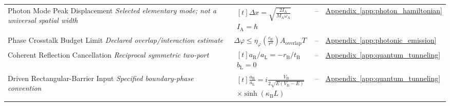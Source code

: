 \begin{longtable}{@{} p{4.5cm} p{6cm} c p{4cm} @{}}
{\raggedright Photon Mode Peak Displacement \newline \textit{Selected elementary mode; not a universal spatial width}\par} & {\raggedright $\begin{gathered}[t]\Delta x=\sqrt{\frac{2I_{\mathrm A}}{M_{\mathrm A}\omega_{\mathrm A}}} \\ I_{\mathrm A}=\hbar\end{gathered}$\par} & -- & {\raggedright \hyperref[app:photon_hamiltonian]{Appendix~\ref*{app:photon_hamiltonian}}\par} \\

{\raggedright Phase Crosstalk Budget Limit \newline \textit{Declared overlap/interaction estimate}\par} & {\raggedright $\Delta\varphi \leq \eta_{\varphi} \left(\frac{c_{\mathrm{E}}}{r^3}\right) A_{\mathrm{overlap}} T$\par} & -- & {\raggedright \hyperref[app:photonic_emission]{Appendix~\ref*{app:photonic_emission}}\par} \\

{\raggedright Coherent Reflection Cancellation \newline \textit{Reciprocal symmetric two-port}\par} & {\raggedright $\begin{gathered}[t]a_{\mathrm R}/a_{\mathrm L}=-r_{\mathrm B}/t_{\mathrm B} \\ b_{\mathrm L}=0\end{gathered}$\par} & -- & {\raggedright \hyperref[app:quantum_tunneling]{Appendix~\ref*{app:quantum_tunneling}}\par} \\

{\raggedright Driven Rectangular-Barrier Input \newline \textit{Specified boundary-phase convention}\par} & {\raggedright $\begin{gathered}[t]\frac{a_{\mathrm R}}{a_{\mathrm L}}=i\frac{V_{\mathrm B}}{2\sqrt{E(V_{\mathrm B}-E)}} \\ \times\sinh(\kappa_{\mathrm B}L)\end{gathered}$\par} & -- & {\raggedright \hyperref[app:quantum_tunneling]{Appendix~\ref*{app:quantum_tunneling}}\par} \\


\end{longtable}
